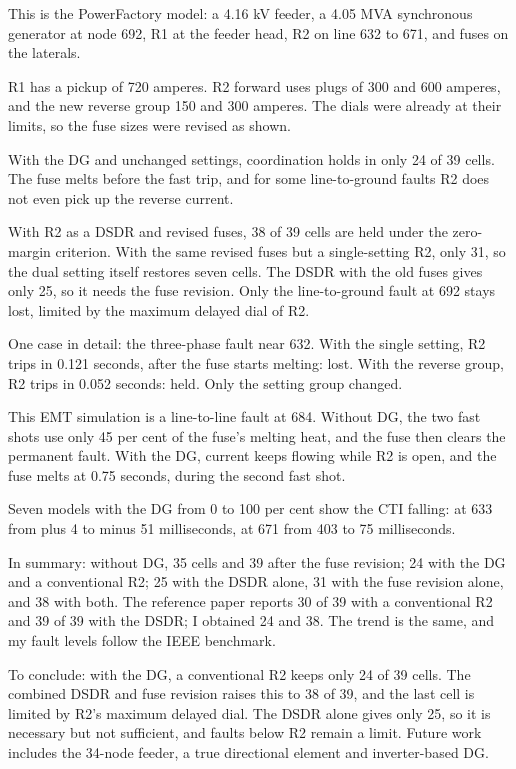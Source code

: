 \documentclass[11pt,a4paper]{article}
\newcommand{\slide}[2]{\par\vspace{4.5pt}\noindent
  \makebox[0.95cm][r]{\fontsize{13}{15}\selectfont\bfseries\color{navy}#1}\hspace{0.3cm}%
  \parbox[t]{\dimexpr\linewidth-1.25cm}{\fontsize{11.3}{14.3}\selectfont\raggedright #2}\par}
\begin{document}
\slide{8}{This is the PowerFactory model: a 4.16 kV feeder, a 4.05 MVA synchronous generator at node 692, R1 at the feeder head, R2 on line 632 to 671, and fuses on the laterals.}

\slide{9}{R1 has a pickup of 720 amperes. R2 forward uses plugs of 300 and 600 amperes, and the new reverse group 150 and 300 amperes. The dials were already at their limits, so the fuse sizes were revised as shown.}

\slide{10}{With the DG and unchanged settings, coordination holds in only 24 of 39 cells. The fuse melts before the fast trip, and for some line-to-ground faults R2 does not even pick up the reverse current.}

\slide{11}{With R2 as a DSDR and revised fuses, 38 of 39 cells are held under the zero-margin criterion. With the same revised fuses but a single-setting R2, only 31, so the dual setting itself restores seven cells. The DSDR with the old fuses gives only 25, so it needs the fuse revision. Only the line-to-ground fault at 692 stays lost, limited by the maximum delayed dial of R2.}

\slide{12}{One case in detail: the three-phase fault near 632. With the single setting, R2 trips in 0.121 seconds, after the fuse starts melting: lost. With the reverse group, R2 trips in 0.052 seconds: held. Only the setting group changed.}

\slide{13}{This EMT simulation is a line-to-line fault at 684. Without DG, the two fast shots use only 45 per cent of the fuse's melting heat, and the fuse then clears the permanent fault. With the DG, current keeps flowing while R2 is open, and the fuse melts at 0.75 seconds, during the second fast shot.}

\slide{14}{Seven models with the DG from 0 to 100 per cent show the CTI falling: at 633 from plus 4 to minus 51 milliseconds, at 671 from 403 to 75 milliseconds.}

\slide{15}{In summary: without DG, 35 cells and 39 after the fuse revision; 24 with the DG and a conventional R2; 25 with the DSDR alone, 31 with the fuse revision alone, and 38 with both. The reference paper reports 30 of 39 with a conventional R2 and 39 of 39 with the DSDR; I obtained 24 and 38. The trend is the same, and my fault levels follow the IEEE benchmark.}

\slide{16}{To conclude: with the DG, a conventional R2 keeps only 24 of 39 cells. The combined DSDR and fuse revision raises this to 38 of 39, and the last cell is limited by R2's maximum delayed dial. The DSDR alone gives only 25, so it is necessary but not sufficient, and faults below R2 remain a limit. Future work includes the 34-node feeder, a true directional element and inverter-based DG.}
\end{document}
